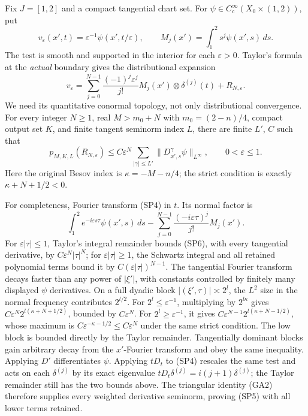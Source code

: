 \documentclass[
  11pt,
]{article}
\begin{document}
Fix \(J=[1,2]\) and a compact tangential chart set. For
\(\psi\in C_c^\infty(X_0\times(1,2))\), put \[
 v_\varepsilon(x',t)=\varepsilon^{-1}
                 \psi(x',t/\varepsilon),\qquad
 M_j(x')=\int_1^2s^j\psi(x',s)\,ds.
 \tag{SP3}
\] The test is smooth and supported in the interior for each
\(\varepsilon>0\). Taylor's formula at the \emph{actual} boundary gives
the distributional expansion \[
 v_\varepsilon
  =\sum_{j=0}^{N-1}
      \frac{(-1)^j\varepsilon^j}{j!}
          M_j(x')\otimes\delta^{(j)}(t)
       +R_{N,\varepsilon}.
 \tag{SP4}
\] We need its quantitative conormal topology, not only distributional
convergence. For every integer \(N\ge1\), real \(M>m_0+N\) with
\(m_0=(2-n)/4\), compact output set \(K\), and finite tangent seminorm
index \(L\), there are finite \(L'\), \(C\) such that \[
 p_{M,K,L}(R_{N,\varepsilon})
       \le C\varepsilon^N
             \sum_{|\gamma|\le L'}
                   \|D_{x',s}^\gamma\psi\|_{L^\infty},
       \qquad0<\varepsilon\le1.
 \tag{SP5}
\] Here the original Besov index is \(\kappa=-M-n/4\); the strict
condition is exactly \(\kappa+N+1/2<0\).

For completeness, Fourier transform (SP4) in \(t\). Its normal factor is
\[
 \int_1^2e^{-i\varepsilon s\tau}\psi(x',s)\,ds
   -\sum_{j=0}^{N-1}
       \frac{(-i\varepsilon\tau)^j}{j!}M_j(x').
 \tag{SP6}
\] For \(\varepsilon|\tau|\le1\), Taylor's integral remainder bounds
(SP6), with every tangential derivative, by \(C\varepsilon^N|\tau|^N\);
for \(\varepsilon|\tau|\ge1\), the Schwartz integral and all retained
polynomial terms bound it by \(C(\varepsilon|\tau|)^{N-1}\). The
tangential Fourier transform decays faster than any power of \(|\xi'|\),
with constants controlled by finitely many displayed \(\psi\)
derivatives. On a full dyadic block \(|(\xi',\tau)|\asymp2^l\), the
\(L^2\) size in the normal frequency contributes \(2^{l/2}\). For
\(2^l\le\varepsilon^{-1}\), multiplying by \(2^{l\kappa}\) gives
\(C\varepsilon^N2^{l(\kappa+N+1/2)}\), bounded by \(C\varepsilon^N\).
For \(2^l\ge\varepsilon^{-1}\), it gives
\(C\varepsilon^{N-1}2^{l(\kappa+N-1/2)}\), whose maximum is
\(C\varepsilon^{-\kappa-1/2}\le
C\varepsilon^N\) under the same strict condition. The low block is
bounded directly by the Taylor remainder. Tangentially dominant blocks
gain arbitrary decay from the \(x'\)-Fourier transform and obey the same
inequality. Applying \(D'\) differentiates \(\psi\). Applying \(tD_t\)
to (SP4) rescales the same test and acts on each \(\delta^{(j)}\) by its
exact eigenvalue \(tD_t\delta^{(j)}=i(j+1)\delta^{(j)}\); the Taylor
remainder still has the two bounds above. The triangular identity (GA2)
therefore supplies every weighted derivative seminorm, proving (SP5)
with all lower terms retained.
\end{document}
